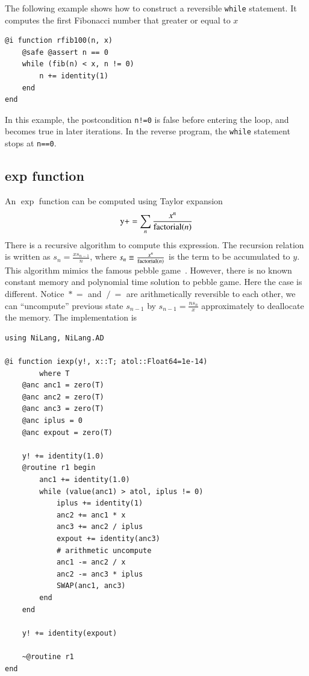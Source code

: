 \documentclass[aps,twocolumn,longbibliography,english,superscriptaddress]{revtex4-1}
\newcommand{\<}{\langle}
\renewcommand{\>}{\rangle}
\theoremstyle{definition}\newtheorem{definition}{\textit{Definition}}
\begin{document}
The following example shows how to construct a reversible \texttt{while} statement. It computes the first Fibonacci number that greater or equal to $x$

\begin{minipage}{.44\textwidth}
\begin{lstlisting}
@i function rfib100(n, x)
    @safe @assert n == 0
    while (fib(n) < x, n != 0)
        n += identity(1)
    end
end
\end{lstlisting}
\end{minipage}

In this example, the postcondition \texttt{n!=0} is false before entering the loop, and becomes true in later iterations. In the reverse program, the \texttt{while} statement stops at \texttt{n==0}.

\subsection{exp function}\label{sec:exp}
An $\exp$ function can be computed using Taylor expansion
\begin{equation}
    {\rm y} += \sum\limits_n \frac{x^n}{{\rm factorial}(n)}
\end{equation}
There is a recursive algorithm to compute this expression.
The recursion relation is written as $s_n = \frac{x s_{n-1}}{n}$, where $s_{n} \equiv \frac{x^n}{{\rm factorial}(n)}$ is the term to be accumulated to $y$.
This algorithm mimics the famous pebble game~\cite{Perumalla2013}. However, there is no known constant memory and polynomial time solution to pebble game.
Here the case is different. Notice $\mathrel{*}=$ and $\mathrel{/}=$ are arithmetically reversible to each other, we can ``uncompute'' previous state $s_{n-1}$ by $s_{n-1} = \frac{n s_n}{x}$ approximately to deallocate the memory.
The implementation is

\begin{minipage}{.44\textwidth}
\begin{lstlisting}
using NiLang, NiLang.AD

@i function iexp(y!, x::T; atol::Float64=1e-14)
        where T
    @anc anc1 = zero(T)
    @anc anc2 = zero(T)
    @anc anc3 = zero(T)
    @anc iplus = 0
    @anc expout = zero(T)

    y! += identity(1.0)
    @routine r1 begin
        anc1 += identity(1.0)
        while (value(anc1) > atol, iplus != 0)
            iplus += identity(1)
            anc2 += anc1 * x
            anc3 += anc2 / iplus
            expout += identity(anc3)
            # arithmetic uncompute
            anc1 -= anc2 / x
            anc2 -= anc3 * iplus
            SWAP(anc1, anc3)
        end
    end

    y! += identity(expout)

    ~@routine r1
end
\end{lstlisting}
\end{minipage}
\end{document}
